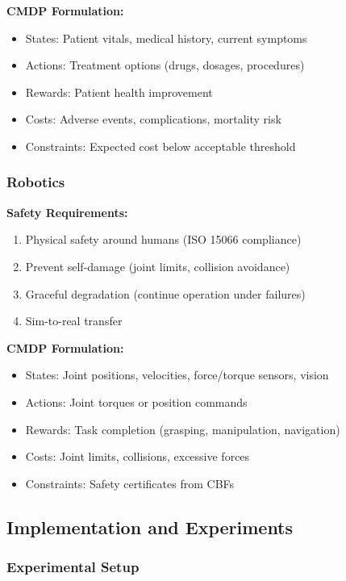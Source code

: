 \documentclass[12pt]{article}
\begin{document}
{{{{\textbf{CMDP Formulation:}
\begin{itemize}
\item States: Patient vitals, medical history, current symptoms
\item Actions: Treatment options (drugs, dosages, procedures)
\item Rewards: Patient health improvement
\item Costs: Adverse events, complications, mortality risk
\item Constraints: Expected cost below acceptable threshold
\end{itemize}

\subsubsection{Robotics}

\textbf{Safety Requirements:}
\begin{enumerate}
\item Physical safety around humans (ISO 15066 compliance)
\item Prevent self-damage (joint limits, collision avoidance)
\item Graceful degradation (continue operation under failures)
\item Sim-to-real transfer
\end{enumerate}

\textbf{CMDP Formulation:}
\begin{itemize}
\item States: Joint positions, velocities, force/torque sensors, vision
\item Actions: Joint torques or position commands
\item Rewards: Task completion (grasping, manipulation, navigation)
\item Costs: Joint limits, collisions, excessive forces
\item Constraints: Safety certificates from CBFs
\end{itemize}

\subsection{Implementation and Experiments}

\subsubsection{Experimental Setup}

}}}}
\end{document}
